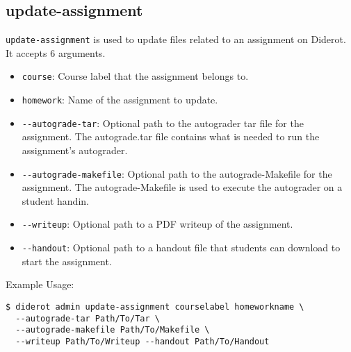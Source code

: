\subsection{update-assignment}

\verb|update-assignment| is used to update files related to an assignment on Diderot.
%
It accepts 6 arguments.

\begin{itemize}
  \item \verb|course|: Course label that the assignment belongs to.
  \item \verb|homework|: Name of the assignment to update.
  \item \verb|--autograde-tar|: Optional path to the autograder tar file for the assignment. The autograde.tar file contains what is needed to run the assignment's autograder.
  \item \verb|--autograde-makefile|: Optional path to the autograde-Makefile for the assignment. The autograde-Makefile is used to execute the autograder on a student handin.
  \item \verb|--writeup|: Optional path to a PDF writeup of the assignment.
  \item \verb|--handout|: Optional path to a handout file that students can download to start the assignment.
\end{itemize}

Example Usage:
\begin{verbatim}
$ diderot admin update-assignment courselabel homeworkname \
  --autograde-tar Path/To/Tar \
  --autograde-makefile Path/To/Makefile \
  --writeup Path/To/Writeup --handout Path/To/Handout
\end{verbatim}
